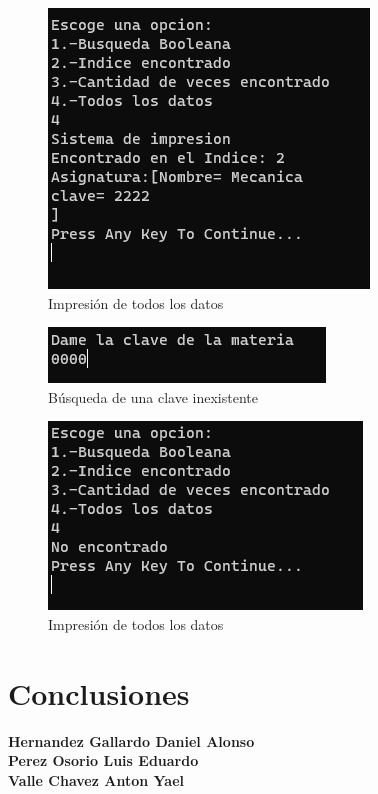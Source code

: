 \documentclass{report}
\begin{document}
\begin{figure}
    \centering
    \includegraphics[width=1\linewidth]{Imagen28.png}
    \caption{Impresión de todos los datos}
    
\end{figure}
\begin{figure}
    \centering
    \includegraphics[width=1\linewidth]{Imagen29.png}
    \caption{Búsqueda de una clave inexistente}
    
\end{figure}
\begin{figure}
    \centering
    \includegraphics[width=1\linewidth]{Imagen30.png}
    \caption{Impresión de todos los datos}
    
\end{figure}




\chapter{Conclusiones}
\textbf{Hernandez Gallardo Daniel Alonso} \\
\newpage
\textbf{Perez Osorio Luis Eduardo} \\

\newpage
\textbf{Valle Chavez Anton Yael} \\
\newpage
\nocite{*}
  \newpage

\end{document}
